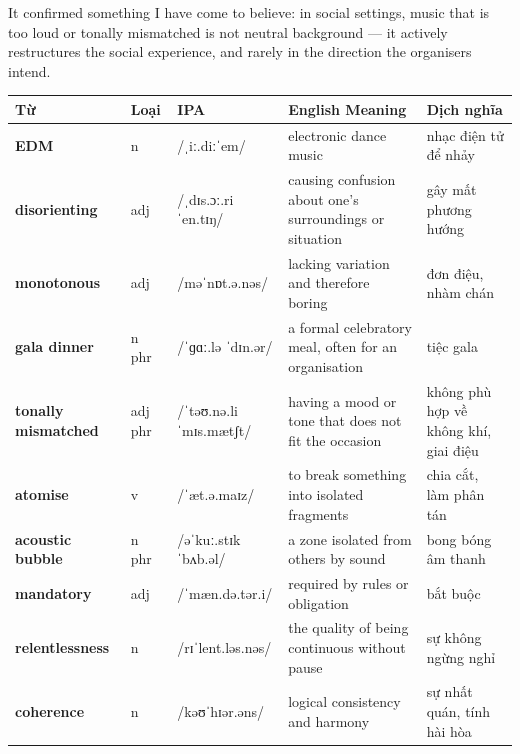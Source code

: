 \begin{ieltsanswer}
It confirmed something I have come to believe: in social settings, music that is too loud or tonally mismatched is not neutral background — it actively restructures the social experience, and rarely in the direction the organisers intend.
\end{ieltsanswer}


\vspace{0.8em}
\begin{center}
\renewcommand{\arraystretch}{1.65}
\begin{tabularx}{\textwidth}{|V{0.22\textwidth}|C{0.07\textwidth}|I{0.20\textwidth}|Y|V{0.18\textwidth}|}
\hline
{}
\textbf{Từ} & \textbf{Loại} & \textbf{IPA} & \textbf{English Meaning} & \textbf{Dịch nghĩa} \\
\hline
\textbf{EDM} & n & /ˌiː.diːˈem/ & electronic dance music & nhạc điện tử để nhảy \\ \hline
\textbf{disorienting} & adj & /ˌdɪs.ɔː.riˈen.tɪŋ/ & causing confusion about one's surroundings or situation & gây mất phương hướng \\ \hline
\textbf{monotonous} & adj & /məˈnɒt.ə.nəs/ & lacking variation and therefore boring & đơn điệu, nhàm chán \\ \hline
\textbf{gala dinner} & n phr & /ˈɡɑː.lə ˈdɪn.ər/ & a formal celebratory meal, often for an organisation & tiệc gala \\ \hline
\textbf{tonally mismatched} & adj phr & /ˈtəʊ.nə.li ˈmɪs.mætʃt/ & having a mood or tone that does not fit the occasion & không phù hợp về không khí, giai điệu \\ \hline
\textbf{atomise} & v & /ˈæt.ə.maɪz/ & to break something into isolated fragments & chia cắt, làm phân tán \\ \hline
\textbf{acoustic bubble} & n phr & /əˈkuː.stɪk ˈbʌb.əl/ & a zone isolated from others by sound & bong bóng âm thanh \\ \hline
\textbf{mandatory} & adj & /ˈmæn.də.tər.i/ & required by rules or obligation & bắt buộc \\ \hline
\textbf{relentlessness} & n & /rɪˈlent.ləs.nəs/ & the quality of being continuous without pause & sự không ngừng nghỉ \\ \hline
\textbf{coherence} & n & /kəʊˈhɪər.əns/ & logical consistency and harmony & sự nhất quán, tính hài hòa \\ \hline
\end{tabularx}
\end{center}

